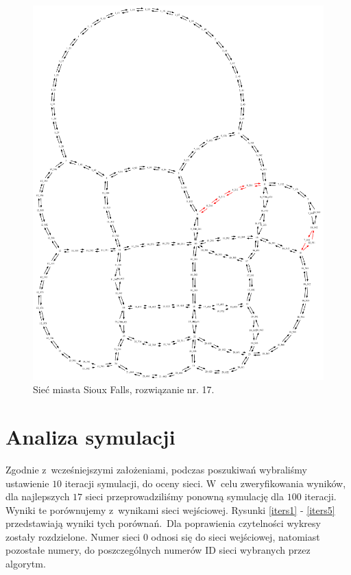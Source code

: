 \documentclass[twoside,12pt]{report}
\begin{document}
\begin{figure}[ht]
\centering
\includegraphics[totalheight=0.580\textheight, angle=90]{img/sioux-out/17/network2}
\caption{Sieć miasta Sioux Falls, rozwiązanie nr. 17.}
\label{sioux17}
\end{figure}

\clearpage
\section{Analiza symulacji}

Zgodnie z~wcześniejszymi założeniami, podczas poszukiwań wybraliśmy ustawienie $10$ iteracji symulacji, do oceny sieci. W~celu zweryfikowania wyników, dla najlepszych $17$ sieci przeprowadziliśmy ponowną symulację dla $100$ iteracji. Wyniki te porównujemy z~wynikami sieci wejściowej. Rysunki \ref{iters1} - \ref{iters5} przedstawiają wyniki tych porównań.~Dla poprawienia czytelności wykresy zostały rozdzielone. Numer sieci $0$ odnosi się do sieci wejściowej, natomiast pozostałe numery, do poszczególnych numerów ID sieci wybranych przez algorytm.
\end{document}
